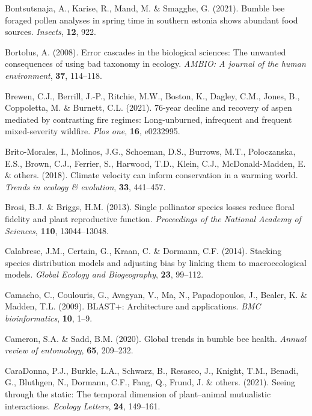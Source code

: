\documentclass[
]{article}
\newlength{\cslhangindent}
\newlength{\cslentryspacingunit} %
\newenvironment{CSLReferences}[2] %
 {%
  \setlength{\parindent}{0pt}
  \ifodd #1
  \let\oldpar\par
  \def\par{\hangindent=\cslhangindent\oldpar}
  \fi
  \setlength{\parskip}{#2\cslentryspacingunit}
 }%
 {}
\begin{document}
\begin{CSLReferences}{1}{0}
\leavevmode{}%
Bontsutsnaja, A., Karise, R., Mand, M. \& Smagghe, G. (2021). Bumble bee
foraged pollen analyses in spring time in southern estonia shows
abundant food sources. \emph{Insects}, \textbf{12}, 922.

\leavevmode{}%
Bortolus, A. (2008). Error cascades in the biological sciences: The
unwanted consequences of using bad taxonomy in ecology. \emph{AMBIO: A
journal of the human environment}, \textbf{37}, 114--118.

\leavevmode{}%
Brewen, C.J., Berrill, J.-P., Ritchie, M.W., Boston, K., Dagley, C.M.,
Jones, B., Coppoletta, M. \& Burnett, C.L. (2021). 76-year decline and
recovery of aspen mediated by contrasting fire regimes: Long-unburned,
infrequent and frequent mixed-severity wildfire. \emph{Plos one},
\textbf{16}, e0232995.

\leavevmode{}%
Brito-Morales, I., Molinos, J.G., Schoeman, D.S., Burrows, M.T.,
Poloczanska, E.S., Brown, C.J., Ferrier, S., Harwood, T.D., Klein, C.J.,
McDonald-Madden, E. \& others. (2018). Climate velocity can inform
conservation in a warming world. \emph{Trends in ecology \& evolution},
\textbf{33}, 441--457.

\leavevmode{}%
Brosi, B.J. \& Briggs, H.M. (2013). Single pollinator species losses
reduce floral fidelity and plant reproductive function.
\emph{Proceedings of the National Academy of Sciences}, \textbf{110},
13044--13048.

\leavevmode{}%
Calabrese, J.M., Certain, G., Kraan, C. \& Dormann, C.F. (2014).
Stacking species distribution models and adjusting bias by linking them
to macroecological models. \emph{Global Ecology and Biogeography},
\textbf{23}, 99--112.

\leavevmode{}%
Camacho, C., Coulouris, G., Avagyan, V., Ma, N., Papadopoulos, J.,
Bealer, K. \& Madden, T.L. (2009). BLAST+: Architecture and
applications. \emph{BMC bioinformatics}, \textbf{10}, 1--9.

\leavevmode{}%
Cameron, S.A. \& Sadd, B.M. (2020). Global trends in bumble bee health.
\emph{Annual review of entomology}, \textbf{65}, 209--232.

\leavevmode{}%
CaraDonna, P.J., Burkle, L.A., Schwarz, B., Resasco, J., Knight, T.M.,
Benadi, G., Bluthgen, N., Dormann, C.F., Fang, Q., Frund, J. \& others.
(2021). Seeing through the static: The temporal dimension of
plant--animal mutualistic interactions. \emph{Ecology Letters},
\textbf{24}, 149--161.


\end{CSLReferences}
\end{document}
